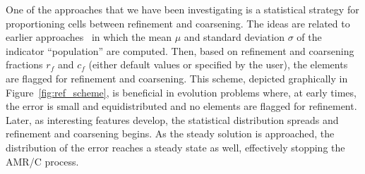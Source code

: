 \documentclass[global,twocolumn,final]{svjour}
\begin{document}
One of the approaches that we have been investigating is a
statistical strategy for proportioning cells between refinement and
coarsening.  The ideas are related to earlier
approaches~\cite{carey_gridbook} in which the mean $\mu$ and standard
deviation $\sigma$ of the indicator ``population'' are computed.
Then, based on refinement and coarsening fractions
$r_f$ and $c_f$ (either default values or specified by the user),
the elements are flagged for
refinement and coarsening.  This scheme, depicted graphically in
Figure~\ref{fig:ref_scheme}, is beneficial in
evolution problems where, at early times, the error is small and
equidistributed 
and no elements are flagged for refinement.  Later, as interesting
features develop, the statistical distribution spreads and
refinement and coarsening begins.  As the steady solution is
approached, the distribution of the error reaches a steady state as
well, effectively stopping the AMR/C process.
\end{document}
